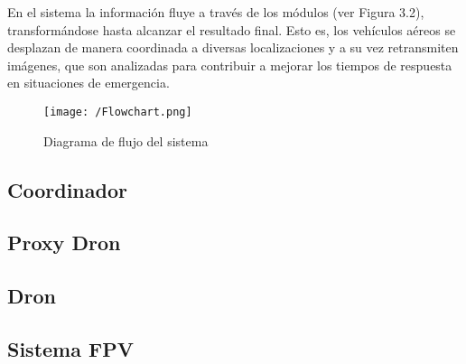 En el sistema la información fluye a través de los módulos (ver Figura 3.2), transformándose hasta alcanzar el resultado final. Esto es, los vehículos aéreos se desplazan de manera coordinada a diversas localizaciones y a su vez retransmiten imágenes, que son analizadas para contribuir a mejorar los tiempos de respuesta en situaciones de emergencia.

\begin{figure}[!h]
\begin{center}
\texttt{[image: /Flowchart.png]}
\caption[Diagrama de flujo del sistema]{Diagrama de flujo del sistema}
\label{fig:diagflujo}
\end{center}
\end{figure}

\subsection{Coordinador}
\label{sec:coordinador}

\subsection{Proxy Dron}
\label{sec:proxydron}

\subsection{Dron}
\label{sec:dron}

\subsection{Sistema FPV}
\label{sec:sistemafpv}

